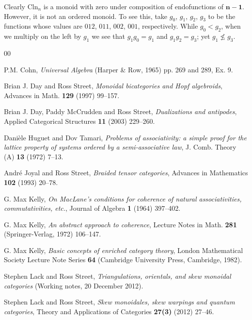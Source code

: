 \documentclass[a4paper,12pt,reqno]{amsart}
\theoremstyle{definition}
\theoremstyle{fact}
\theoremstyle{genquest}
\theoremstyle{step}
\begin{document}
Clearly $\mathrm{Cln}_n$ is a monoid with zero under composition of endofunctions of $\mathbf{n-1}$.
However, it is not an ordered monoid. 
To see this, take $g_0$, $g_1$, $g_2$, $g_3$ to be the functions
whose values are $012$, $011$, $002$, $001$, respectively. 
While $g_0 < g_2$, when we multiply
on the left by $g_1$ we see that $g_1 g_0 = g_1$ and $g_1 g_2 = g_3$; yet $g_1 \nleq g_3$. 


\begin{thebibliography}{00}

 P.M. Cohn, \textit{Universal Algebra} (Harper \& Row, 1965) pp. 269 and 289, Ex. 9.\label{Cohn1965}

 Brian J. Day and Ross Street, \textit{Monoidal bicategories and Hopf algebroids}, Advances in Math. \textbf{129} (1997) 99--157. \label{DaySt1997}

 Brian J. Day, Paddy McCrudden and Ross Street, \textit{Dualizations and antipodes}, Applied Categorical Structures \textbf{11} (2003) 229--260. \label{DMcCS]}

 Dani\`ele Huguet and Dov Tamari, \textit{Problems of associativity: a simple proof for the lattice property of
systems ordered by a semi-associative law}, J. Comb. Theory (A) \textbf{13} (1972) 7--13.\label{HT}  

  Andr\'e Joyal and Ross Street, \textit{Braided tensor categories}, Advances in Mathematics \textbf{102} (1993) 20--78.\label{btc}

 G. Max Kelly, \textit{On MacLane's conditions for coherence of natural associativities, commutativities, etc.}, Journal of Algebra \textbf{1} (1964) 397--402.\label{Kelly1964}

 G. Max Kelly, \textit{An abstract approach to coherence}, Lecture Notes in Math. \textbf{281} (Springer-Verlag, 1972) 106--147.\label{aac}

 G. Max Kelly, \textit{Basic concepts of enriched category theory}, London Mathematical Society Lecture Note Series \textbf{64} (Cambridge University Press, Cambridge, 1982). \label{KellyBook}

 Stephen Lack and Ross Street, \textit{Triangulations, orientals, and skew monoidal categories} (Working notes, 20 December 2012).\label{Steve20Dec2012} 

 Stephen Lack and Ross Street, \textit{Skew monoidales, skew warpings and quantum categories}, Theory and Applications of Categories \textbf{27(3)} (2012) 27--46.
\label{SkMon}


\end{thebibliography}
\end{document}
